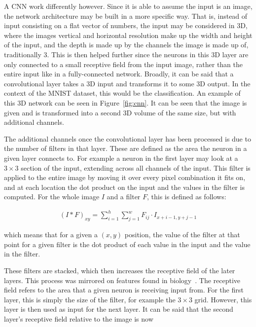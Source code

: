 A CNN work differently however. Since it is able to assume the input is an
image, the network architecture may be built in a more specific way. That is,
instead of input consisting on a flat vector of numbers, the input may be
considered in 3D, where the images vertical and horizontal resolution make up
the width and height of the input, and the depth is made up by the channels the
image is made up of, traditionally 3. This is then helped further since the
neurons in this 3D layer are only connected to a small receptive field from the
input image, rather than the entire input like in a fully-connected network.
Broadly, it can be said that a convolutional layer takes a 3D input and
transforms it to some 3D output. In the context of the MNIST dataset, this
would be the classification. An example of this 3D network can be seen in
Figure~\ref{fig:cnn}. It can be seen that the image is given and is transformed
into a second 3D volume of the same size, but with additional channels.

The additional channels once the convolutional layer has been processed is due
to the number of filters in that layer. These are defined as the area the
neuron in a given layer connects to. For example a neuron in the first layer
may look at a $3 \times 3$ section of the input, extending across all channels
of the input. This filter is applied to the entire image by moving it over every
pixel combination it fits on, and at each location the dot product on the input
and the values in the filter is computed. For the whole image $I$ and a filter
$F$, this is defined as follows:

\begin{align}
    {(I*F)}_{xy} = \sum^{h}_{i=1} \sum^{w}_{j=1} F_{ij} \cdot I_{x+i-1, y+j-1}
\end{align}

which means that for a given a $(x,y)$ position, the value of the filter at that
point for a given filter is the dot product of each value in the input and the
value in the filter.

These filters are stacked, which then increases the receptive field of the later
layers. This process was mirrored on features found in
biology~\cite{hubel1968receptive}. The receptive field refers to the area that a
given neuron is receiving input from. For the first layer, this is simply the
size of the filter, for example the $3 \times 3$ grid. However, this layer is
then used as input for the next layer. It can be said that the second layer's
receptive field relative to the image is now 

